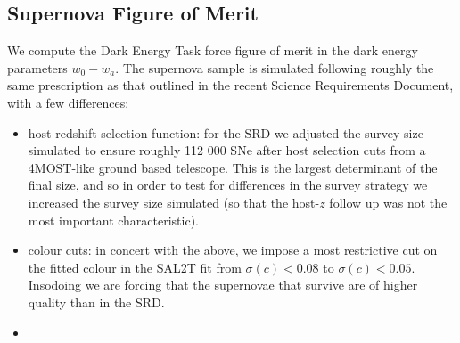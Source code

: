 \subsection{Supernova Figure of Merit}
We compute the Dark Energy Task force figure of merit in the dark energy parameters $w_0-w_a.$
The supernova sample is simulated following roughly the same prescription as that outlined in the recent Science Requirements Document, with a few differences:
\begin{itemize}
\item host redshift selection function: for the SRD we adjusted the survey size simulated to ensure roughly 112 000 SNe after host selection cuts from a 4MOST-like ground based telescope. This is the largest determinant of the final size, and so in order to test for differences in the survey strategy we increased the survey size simulated (so that the host-$z$ follow up was not the most important characteristic).
\item colour cuts: in concert with the above, we impose a most restrictive cut on the fitted colour in the SAL2T fit from $\sigma(c) < 0.08$ to $\sigma(c) < 0.05.$ Insodoing we are forcing that the supernovae that survive are of higher quality than in the SRD.
\item 
\end{itemize}
